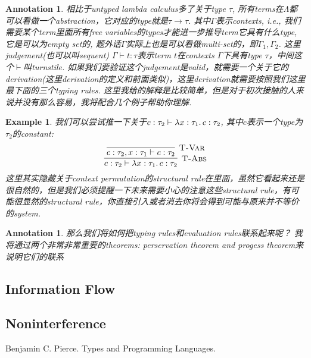 \documentclass{article}
\newtheorem{example}[theorem]{Example}
\newtheorem{annotation}[theorem]{Annotation}
\newcommand{\lam}[2]{\ensuremath{\lambda #1\ldotp #2}} %
\newcommand{\termtype}[2]{\ensuremath{#1:#2}}
\begin{document}
\begin{annotation}
\rm 相比于untyped lambda calculus多了关于type $\tau$, 所有terms在$\Lambda$都可以看做一个abstraction，它对应的type就是$\tau \to \tau$. 其中$\Gamma$表示contexts, i.e., 我们需要某个term里面所有free variables的types才能进一步推导term它具有什么type, 它是可以为empty set的, 题外话$\Gamma$实际上也是可以看做multi-set的，即$\Gamma_1, \Gamma_2$. 这里judgement(也可以叫sequent) $\Gamma \vdash t:\tau$表示term $t$在contexts $\Gamma$下具有type $\tau$，中间这个$\vdash$叫turnstile. 如果我们要验证这个judgement是valid，就需要一个关于它的derivation(这里derivation的定义和前面类似)，这里derivation就需要按照我们这里最下面的三个typing rules. 这里我给的解释是比较简单，但是对于初次接触的人来说并没有那么容易，我将配合几个例子帮助你理解. 
\end{annotation}

\begin{example}
\rm 我们可以尝试推一下关于$\termtype{c}{\tau_2}\vdash \termtype{\lam{\termtype{x}{\tau_1}}{c}}{\tau_2}$, 其中$c$表示一个type为$\tau_2$的constant:
\[
	\infer[\textsc{T-Abs}]{\termtype{c}{\tau_2}\vdash \termtype{\lam{\termtype{x}{\tau_1}}{c}}{\tau_2}}{\infer[\textsc{T-Var}]{\termtype{c}{\tau_2},\termtype{x}{\tau_1} \vdash \termtype{c}{\tau_2}}{}}
\]
这里其实隐藏关于context permutation的structural rule在里面，虽然它看起来还是很自然的，但是我们必须提醒一下未来需要小心的注意这些structural rule，有可能很显然的structural rule，你直接引入或者消去你将会得到可能与原来并不等价的system.  
\end{example}

\begin{annotation}
\rm 那么我们将如何把typing rules和evaluation rules联系起来呢？ 我将通过两个非常非常重要的theorems: \emph{perservation theorem} and \emph{progess theorem}来说明它们的联系
\end{annotation}

\subsection{Information Flow}

\subsection{Noninterference}

\begin{thebibliography}{9}
Benjamin C. Pierce. Types and Programming Languages.
\end{thebibliography}
\end{document}
